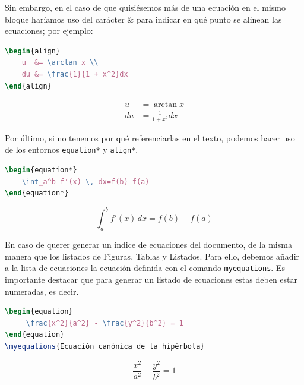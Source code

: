 \documentclass[%
    school=etsisi,%
    degree=61TI,%
]{upm-report}
\begin{document}
Sin embargo, en el caso de que quisiésemos más de una ecuación en el mismo bloque haríamos uso del carácter \& para indicar en qué punto se alinean las ecuaciones; por ejemplo:

\begin{minipage}[c]{.5\textwidth}
\begin{lstlisting}[language=tex]
\begin{align}
    u  &= \arctan x \\ 
    du &= \frac{1}{1 + x^2}dx
\end{align}
\end{lstlisting}
\end{minipage}%
\begin{minipage}[c]{.5\textwidth}
\begin{align}
    u  &= \arctan x \\ 
    du &= \frac{1}{1 + x^2}dx
\end{align}
\end{minipage}

Por último, si no tenemos por qué referenciarlas en el texto, podemos hacer uso de los entornos \texttt{equation*} y \texttt{align*}.

\begin{minipage}[c]{.5\textwidth}
\begin{lstlisting}[language=tex]
\begin{equation*}
    \int_a^b f'(x) \, dx=f(b)-f(a)
\end{equation*}
\end{lstlisting}
\end{minipage}%
\begin{minipage}[c]{.5\textwidth}
\begin{equation*}
    \int_a^b f'(x) \, dx=f(b)-f(a)
\end{equation*}
\end{minipage}

En caso de querer generar un índice de ecuaciones del documento, de la misma manera que los listados de Figuras, Tablas y Listados. Para ello, debemos añadir a la lista de ecuaciones la ecuación definida con el comando \texttt{myequations}. Es importante destacar que para generar un listado de ecuaciones estas deben estar numeradas, es decir.

\begin{minipage}[c]{.5\textwidth}
\begin{lstlisting}[language=tex]
\begin{equation}
     \frac{x^2}{a^2} - \frac{y^2}{b^2} = 1
\end{equation}
\myequations{Ecuación canónica de la hipérbola}
\end{lstlisting}
\end{minipage}%
\begin{minipage}[c]{.5\textwidth}
\begin{equation}
     \frac{x^2}{a^2} - \frac{y^2}{b^2} = 1
\end{equation}
\end{minipage} 
\end{document}
